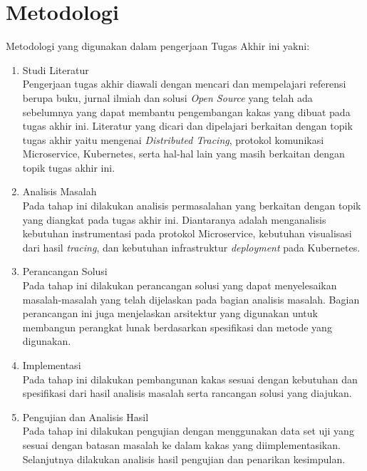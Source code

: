\section{Metodologi}

Metodologi yang digunakan dalam pengerjaan Tugas Akhir ini yakni:
\begin{enumerate}
    \item Studi Literatur \\
          Pengerjaan tugas akhir diawali dengan mencari dan mempelajari referensi berupa buku, jurnal ilmiah dan solusi \textit{Open Source}  yang telah ada sebelumnya yang dapat membantu pengembangan kakas yang dibuat pada tugas akhir ini. Literatur yang dicari dan dipelajari berkaitan dengan topik tugas akhir yaitu mengenai \textit{Distributed Tracing},  protokol komunikasi Microservice, Kubernetes, serta hal-hal lain yang masih berkaitan dengan topik tugas akhir ini.

    \item Analisis Masalah \\
          Pada tahap ini dilakukan analisis permasalahan yang berkaitan dengan topik yang diangkat pada tugas akhir ini. Diantaranya adalah menganalisis kebutuhan instrumentasi pada protokol Microservice, kebutuhan visualisasi dari hasil \textit{tracing}, dan kebutuhan infrastruktur \textit{deployment} pada Kubernetes.

    \item Perancangan Solusi \\
          Pada tahap ini dilakukan perancangan solusi yang dapat menyelesaikan masalah-masalah yang telah dijelaskan pada bagian analisis masalah. Bagian perancangan ini juga menjelaskan arsitektur yang digunakan untuk membangun perangkat lunak berdasarkan spesifikasi dan metode yang digunakan.

    \item Implementasi \\
          Pada tahap ini dilakukan pembangunan kakas sesuai dengan kebutuhan dan spesifikasi dari hasil analisis masalah serta rancangan solusi yang diajukan.

    \item Pengujian dan Analisis Hasil \\
          Pada tahap ini dilakukan pengujian dengan menggunakan data set uji yang sesuai dengan batasan masalah ke dalam kakas yang diimplementasikan. Selanjutnya dilakukan analisis hasil pengujian dan penarikan kesimpulan.

\end{enumerate}

